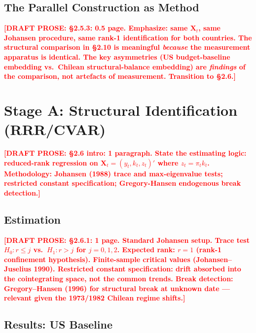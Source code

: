 \documentclass[12pt,letterpaper]{article}
\newcommand{\pit}{\pi_t}           %
\newcommand{\draftnote}[1]{%
  \textcolor{red}{\textbf{[DRAFT PROSE: #1]}}}
\begin{document}
\subsection{The Parallel Construction as Method}
\label{sec:bridge_method}

\draftnote{§2.5.3: 0.5 page. Emphasize: same $\mathbf{X}_t$, same Johansen procedure,
  same rank-1 identification for both countries. The structural comparison in §2.10
  is meaningful \emph{because} the measurement apparatus is identical.
  The key asymmetries (US budget-baseline embedding vs.\ Chilean structural-balance
  embedding) are \emph{findings} of the comparison, not artefacts of measurement.
  Transition to §2.6.}


\section{Stage A: Structural Identification (RRR/CVAR)}
\label{sec:stageA}

\draftnote{§2.6 intro: 1 paragraph. State the estimating logic:
  reduced-rank regression on $\mathbf{X}_t = (y_t, k_t, z_t)'$ where $z_t = \pit k_t$.
  Methodology: Johansen (1988) trace and max-eigenvalue tests;
  restricted constant specification; Gregory-Hansen endogenous break detection.}


\subsection{Estimation}
\label{sec:stageA_est}

\draftnote{§2.6.1: 1 page. Standard Johansen setup.
  Trace test $H_0: r \leq j$ vs.\ $H_1: r > j$ for $j = 0, 1, 2$.
  Expected rank: $r = 1$ (rank-1 confinement hypothesis).
  Finite-sample critical values (Johansen--Juselius 1990).
  Restricted constant specification: drift absorbed into the
  cointegrating space, not the common trends.
  Break detection: Gregory--Hansen (1996) for structural break
  at unknown date — relevant given the 1973/1982 Chilean regime shifts.}


\subsection{Results: US Baseline}
\label{sec:stageA_us}
\end{document}
